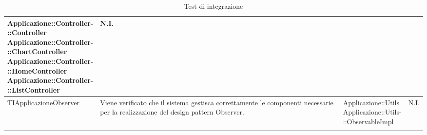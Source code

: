 \begin{longtabu}{| X | X | X[0.9] | X[0.3] |}
{			Applicazione::Controller-\\::Controller\\
			Applicazione::Controller-\\::ChartController\\
			Applicazione::Controller-\\::HomeController\\
			Applicazione::Controller-\\::ListController}
			& N.I.
\\ \hline
			TIApplicazioneObserver &
			Viene verificato che il sistema gestisca correttamente le componenti necessarie per la realizzazione del design pattern Observer.
			& \parbox[t]{0.6\textwidth}{
			Applicazione::Utils\\
			Applicazione::Utils-\\::ObservableImpl}
			& N.I. 
\\ \hline

\caption{Test di integrazione}

\end{longtabu}
